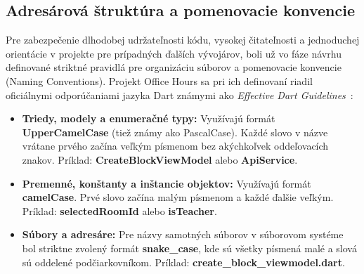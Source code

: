 \subsection{Adresárová štruktúra a pomenovacie konvencie}
\label{subsec:strukturanavrh}
Pre zabezpečenie dlhodobej udržateľnosti kódu, vysokej čitateľnosti a jednoduchej orientácie v projekte pre prípadných ďalších vývojárov, boli už vo fáze návrhu definované striktné pravidlá pre organizáciu súborov a pomenovacie konvencie (Naming Conventions). Projekt Office Hours sa pri ich definovaní riadil oficiálnymi odporúčaniami jazyka Dart známymi ako \textit{Effective Dart Guidelines}~\cite{effectivedart}:
\begin{itemize}
    \item \textbf{Triedy, modely a enumeračné typy:} Využívajú formát \textbf{UpperCamelCase} (tiež známy ako PascalCase). Každé slovo v názve vrátane prvého začína veľkým písmenom bez akýchkoľvek oddeľovacích znakov. Príklad: \textbf{CreateBlockViewModel} alebo \textbf{ApiService}.
    \item \textbf{Premenné, konštanty a inštancie objektov:} Využívajú formát \textbf{camelCase}. Prvé slovo začína malým písmenom a každé ďalšie veľkým. Príklad: \textbf{selectedRoomId} alebo \textbf{isTeacher}.
    \item \textbf{Súbory a adresáre:} Pre názvy samotných súborov v súborovom systéme bol striktne zvolený formát \textbf{snake\_case}, kde sú všetky písmená malé a slová sú oddelené podčiarkovníkom. Príklad: \textbf{create\_block\_viewmodel.dart}.
\end{itemize}

